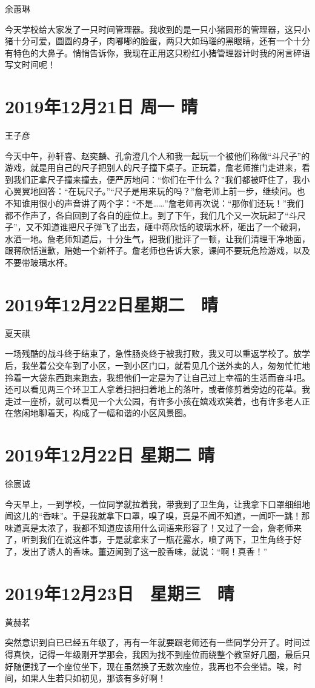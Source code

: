 余蕙琳

今天学校给大家发了一只时间管理器。我收到的是一只小猪圆形的管理器，这只小猪十分可爱，圆圆的身子，肉嘟嘟的脸蛋，两只大如玛瑙的黑眼睛，还有一个十分有特色的大鼻子。悄悄告诉你，我现在正用这只粉红小猪管理器计时我的闲言碎语写文时间呢！

\section{2019年12月21日 周一 晴}

王子彦

今天中午，孙轩睿、赵奕麟、孔俞澄几个人和我一起玩一个被他们称做``斗尺子''的游戏，就是用自己的尺子把别人的尺子撞下桌子。正玩着，詹老师推门走进来，看到我们正拿尺子撞来撞去，便严厉地问：``你们在干什么？''我们都被吓住了，我小心翼翼地回答：``在玩尺子。''``尺子是用来玩的吗？''詹老师上前一步，继续问。也不知谁用很小的声音讲了两个字：``不是\ldots\ldots{}''詹老师再次说：``那你们还玩！''我们都不作声了，各自回到了各自的座位上。到了下午，我们几个又一次玩起了``斗尺子''，又不知道谁把尺子弹飞了出去，砸中蒋欣恬的玻璃水杯，砸出了一个破洞，水洒一地。詹老师知道后，十分生气，把我们批评了一顿，让我们清理干净地面，跟蒋欣恬道歉，赔她一个新杯子。詹老师也告诉大家，课间不要玩危险游戏，以及不要带玻璃水杯。

\section{2019年12月22日星期二~ 晴}

夏天祺

一场残酷的战斗终于结束了，急性肠炎终于被我打败，我又可以重返学校了。放学后，我坐着公交车到了小区，一到小区门口，就看见几个送外卖的人，匆匆忙忙地拎着一大袋东西跑来跑去，我想他们一定是为了让自己过上幸福的生活而奋斗吧。还可以看见两三个环卫工人拿着扫把扫着地上的落叶，或者修剪着旁边的花草。我走过一座桥，就可以看见一个大公园，有许多小孩在嬉戏欢笑着，也有许多老人正在悠闲地聊着天，构成了一幅和谐的小区风景图。

\section{2019年12月22日 星期二 晴}

徐宸诚

今天早上，一到学校，一位同学就拉着我，带我到了卫生角，让我拿下口罩细细地闻这儿的``香味''。于是我就拿下口罩，嗅了嗅，真是不闻不知道，一闻吓一跳！那味道真是太浓了，我都不知道应该用什么词语来形容了！又过了一会，詹老师来了，听到我们在说这件事，于是就拿来了一瓶花露水，喷了两下，卫生角终于好了，发出了诱人的香味。董迈闻到了这一股香味，就说：``啊！真香！''

\section{2019年12月23日 ~星期三 ~晴}

黄赫茗

突然意识到自已已经五年级了，再有一年就要跟老师还有一些同学分开了。时间过得真快，记得一年级刚开学那会，我因为找不到座位而绕整个教室好几圈，最后只好随便找了一个座位坐下，现在虽然换了无数次座位，我再也不会坐错。唉，时间，如果人生若只如初见，那该有多好啊！

